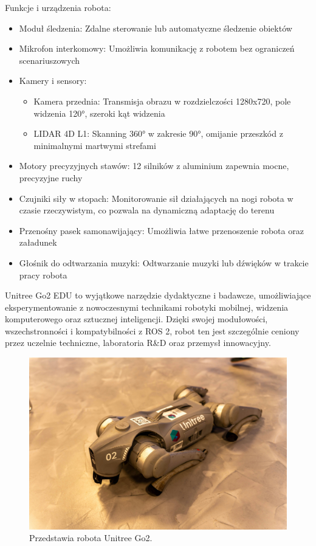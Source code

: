 \documentclass[12pt]{article}
\begin{document}
Funkcje i urządzenia robota:
\begin{itemize}
    \item Moduł śledzenia: Zdalne sterowanie lub automatyczne śledzenie obiektów
    \item Mikrofon interkomowy: Umożliwia komunikację z robotem bez ograniczeń scenariuszowych
    \item Kamery i sensory:
    \begin{itemize}
        \item Kamera przednia: Transmisja obrazu w rozdzielczości 1280x720, pole widzenia 120°, szeroki kąt widzenia
        \item LIDAR 4D L1: Skanning 360° w zakresie 90°, omijanie przeszkód z minimalnymi martwymi strefami
    \end{itemize}
    \item Motory precyzyjnych stawów: 12 silników z aluminium zapewnia mocne, precyzyjne ruchy
    \item Czujniki siły w stopach: Monitorowanie sił działających na nogi robota w czasie rzeczywistym, co pozwala na dynamiczną adaptację do terenu
    \item Przenośny pasek samonawijający: Umożliwia łatwe przenoszenie robota oraz załadunek
    \item Głośnik do odtwarzania muzyki: Odtwarzanie muzyki lub dźwięków w trakcie pracy robota
\end{itemize}


Unitree Go2 EDU to wyjątkowe narzędzie dydaktyczne i badawcze, umożliwiające eksperymentowanie z nowoczesnymi technikami robotyki mobilnej, widzenia komputerowego oraz sztucznej inteligencji. Dzięki swojej modułowości, wszechstronności i kompatybilności z ROS 2, robot ten jest szczególnie ceniony przez uczelnie techniczne, laboratoria R\&D oraz przemysł innowacyjny.


\begin{figure}[h]
    \centering
    \includegraphics[width=0.75\linewidth]{Zdjęcia/prawdziwyPies.jpg}
    \caption{Przedstawia robota Unitree Go2.}
    \label{prawdziwyPies}
\end{figure}
\end{document}
